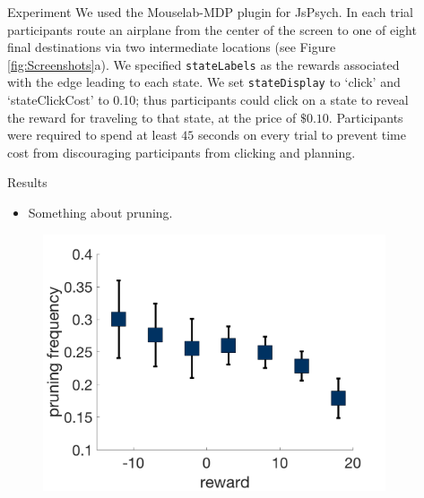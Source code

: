 \documentclass[final]{beamer}
\newlength{\sepwid}
\newlength{\onecolwid}
\newlength{\twocolwid}
\begin{document}
\begin{frame}[t, fragile]
\begin{columns}[t]
\begin{column}{\twocolwid}
\end{column} %
\begin{column}{\sepwid}\end{column} %
\begin{column}{\onecolwid} %

  \begin{block}{Experiment}\label{experiment}
  We used the Mouselab-MDP plugin for JsPsych. In each trial participants route an airplane from the center of the screen to one of eight final destinations via two intermediate locations (see Figure \ref{fig:Screenshots}a). We specified \texttt{stateLabels} as the rewards associated with the edge leading to each state. We set \texttt{stateDisplay} to `click' and `stateClickCost' to 0.10; thus participants could click on a state to reveal the reward for traveling to that state, at the price of $\$0.10$. Participants were required to spend at least $45$ seconds on every trial to prevent time cost from discouraging participants from clicking and planning. 

  \end{block}

  \begin{alertblock}{Results}\label{results}
    \begin{itemize}
      \item Something about pruning.
    \end{itemize}
  \end{alertblock}

  \begin{figure}
    \includegraphics[width=0.9\linewidth]{figs/prunning_any_noFB.png}
  \end{figure}


\end{column}
\end{columns}
\end{frame}
\end{document}
